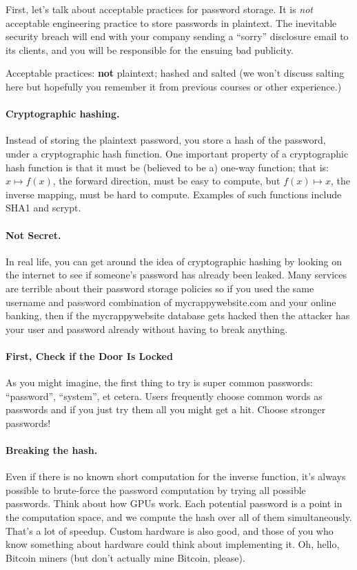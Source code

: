 \documentclass[a4paper]{report}
\begin{document}
First, let's talk about acceptable practices for password storage. It is \emph{not}
acceptable engineering practice to store passwords in plaintext. The inevitable security
breach will end with your company sending a ``sorry'' disclosure email to its clients,
and you will be responsible for the ensuing bad publicity.

Acceptable practices: {\bf not} plaintext; hashed and salted (we won't discuss salting here but hopefully you remember it from previous courses or other experience.)

\paragraph{Cryptographic hashing.} Instead of storing the plaintext password, you
store a hash of the password, under a cryptographic hash function. One important
property of a cryptographic hash function is that it must be (believed to be a) one-way
function; that is: $x \mapsto f(x)$, the forward direction, must be easy to compute, but
$f(x) \mapsto x$, the inverse mapping, must be hard to compute. Examples of such functions
include SHA1 and scrypt.

\paragraph{Not Secret.}
In real life, you can get around the idea of cryptographic hashing by looking on the internet to see if someone's password has already been leaked. Many services are terrible about their password storage policies so if you used the same username and password combination of mycrappywebsite.com and your online banking, then if the mycrappywebsite database gets hacked then the attacker has your user and password already without having to break anything.

\paragraph{First, Check if the Door Is Locked}
As you might imagine, the first thing to try is super common passwords: ``password'', ``system'', et cetera. Users frequently choose common words as passwords and if you just try them all you might get a hit. Choose stronger passwords!

\paragraph{Breaking the hash.} Even if there is no known short computation for the
inverse function, it's always possible to brute-force the password
computation by trying all possible passwords. Think about how GPUs
work. Each potential password is a point in the computation space, and
we compute the hash over all of them simultaneously.  That's a lot of
speedup. Custom hardware is also good, and those of you who know
something about hardware could think about implementing
it. Oh, hello, Bitcoin miners (but don't actually mine Bitcoin, please).
\end{document}
